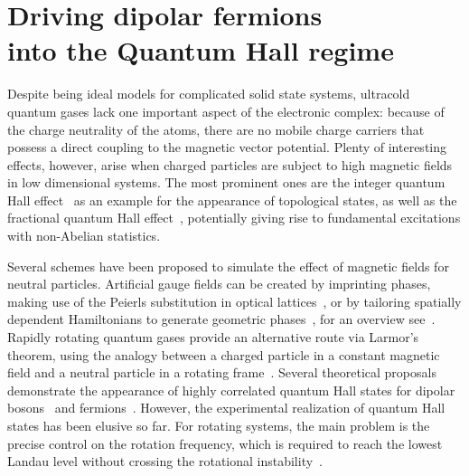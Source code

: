 \chapter[Driving dipolar fermions into the Quantum Hall regime]{Driving dipolar fermions\texorpdfstring{\\}{ }into the Quantum Hall regime}
\label{dipolar_fermions}

Despite being ideal models for complicated solid state systems, ultracold quantum gases lack one important aspect of the electronic complex: because of the charge neutrality of the atoms, there are no mobile charge carriers that possess a direct coupling to the magnetic vector potential. Plenty of interesting effects, however, arise when charged particles are subject to high magnetic fields in low dimensional systems. The most prominent ones are the integer quantum Hall effect~\cite{Klitzing1980} as an example for the appearance of topological states, as well as the fractional quantum Hall effect~\cite{Laughlin1983}, potentially giving rise to fundamental excitations with non-Abelian statistics.

Several schemes have been proposed to simulate the effect of magnetic fields for neutral particles. Artificial gauge fields can be created by imprinting phases, making use of the Peierls substitution in optical lattices~\cite{Aidelsburger2011,Jimenez-Garcia2012,Struck2012}, or by tailoring spatially dependent Hamiltonians to generate geometric phases~\cite{Lin2009}, for an overview see~\cite{Dalibard2011}. Rapidly rotating quantum gases provide an alternative route via Larmor's theorem, using the analogy between a charged particle in a constant magnetic field and a neutral particle in a rotating frame~\cite{Cooper2008,Fetter2009}. Several theoretical proposals demonstrate the appearance of highly correlated quantum Hall states for dipolar bosons~\cite{Cooper2005} and fermions~\cite{Baranov2005,Osterloh2007}. However, the experimental realization of quantum Hall states has been elusive so far. For rotating systems, the main problem is the precise control on the rotation frequency, which is required to reach the lowest Landau level without crossing the rotational instability~\cite{Schweikhard2004}.

